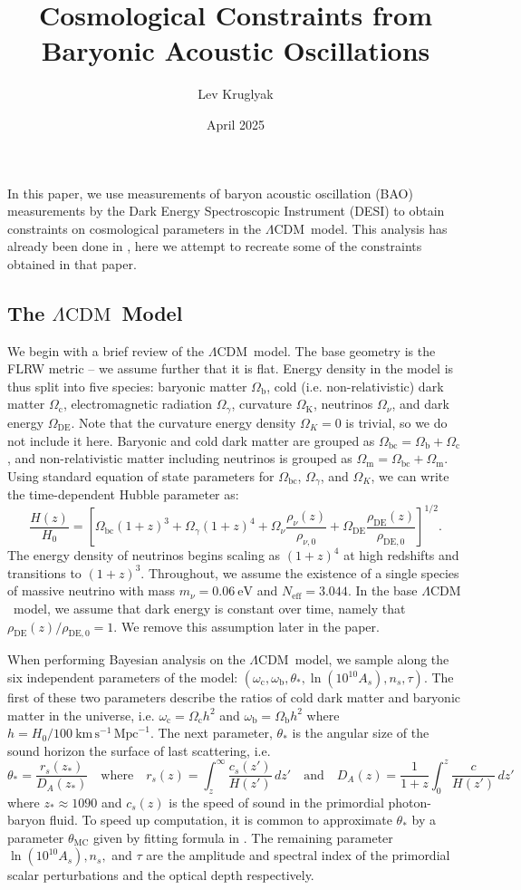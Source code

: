 \documentclass{lkx_paper}
\title{Cosmological Constraints from \\Baryonic Acoustic Oscillations}
\date{April 2025}
\author{Lev Kruglyak}
\renewcommand{\b}{{\mathrm{b}}}
\renewcommand{\c}{{\mathrm{c}}}
\newcommand{\bc}{{\mathrm{bc}}}
\newcommand{\K}{{\mathrm{K}}}
\newcommand{\m}{{\mathrm{m}}}
\newcommand{\DE}{{\mathrm{DE}}}
\newcommand{\MC}{{\mathrm{MC}}}
\newcommand{\LCDM}{$\Lambda\mathrm{CDM}$~}
\newcommand{\Neff}{{N_\mathrm{eff}}}
\providecommand{\eVsi}[1]{\qty{#1}{\mathrm{eV}}}
\providecommand{\Hsi}[1]{\qty{#1}{\km\,\s^{-1}\,\mathrm{Mpc}^{-1}}}
\begin{document}
In this paper, we use measurements of baryon acoustic oscillation (BAO) measurements by the Dark Energy Spectroscopic Instrument (DESI) to obtain constraints on cosmological parameters in the \LCDM model. This analysis has already been done in \cite{desicollaboration2025desidr2resultsii}, here we attempt to recreate some of the constraints obtained in that paper.

\subsection*{The \LCDM Model}
We begin with a brief review of the \LCDM model. The base geometry is the FLRW metric -- we assume further that it is flat.
Energy density in the model is thus split into five species: baryonic matter $\Omega_\b$, cold (i.e. non-relativistic) dark matter $\Omega_\c$, electromagnetic radiation $\Omega_\gamma$, curvature $\Omega_\K$, neutrinos $\Omega_\nu$, and dark energy $\Omega_\DE$. Note that the curvature energy density $\Omega_K=0$ is trivial, so we do not include it here. Baryonic and cold dark matter are grouped as $\Omega_\bc=\Omega_\b+\Omega_\c$, and non-relativistic matter including neutrinos is grouped as $\Omega_\m=\Omega_\bc+\Omega_\m$.
Using standard equation of state parameters for $\Omega_\bc$, $\Omega_\gamma$, and $\Omega_K$, we can write the time-dependent Hubble parameter as:
\begin{equation}
  \frac{H(z)}{H_0} = 
  \left[\Omega_\bc(1+z)^3 + \Omega_\gamma(1+z)^4+\Omega_\nu\frac{\rho_\nu(z)}{\rho_{\nu,0}} + \Omega_\DE \frac{\rho_\DE(z)}{\rho_{\DE,0}}\right]^{1/2}.
\end{equation}
The energy density of neutrinos begins scaling as $(1+z)^4$ at high redshifts and transitions to $(1+z)^3$. Throughout, we assume the existence of a single species of massive neutrino with mass $m_\nu = \eVsi{0.06}$ and $\Neff=3.044$. In the base \LCDM model, we assume that dark energy is constant over time, namely that $\rho_{\DE}(z)/\rho_{\DE,0}=1$. We remove this assumption later in the paper.

When performing Bayesian analysis on the \LCDM model, we sample along the six independent parameters of the model: $(\omega_\c, \omega_\b, \theta_*, \ln(10^{10}A_s), n_s, \tau)$. The first of these two parameters describe the ratios of cold dark matter and baryonic matter in the universe, i.e. $\omega_\c=\Omega_\c h^2$ and $\omega_\b = \Omega_\b h^2$ where $h=H_0/\Hsi{100}$. The next parameter, $\theta_*$ is the angular size of the sound horizon the surface of last scattering, i.e.
\begin{equation}
  \theta_* = \frac{r_s(z_*)}{D_A(z_*)}\quad\textrm{where}\quad
  r_s(z) = \int_z^\infty \frac{c_s(z')}{H(z')}\,dz'\quad\textrm{and}\quad D_A(z)=\frac{1}{1+z}\int_0^z\frac{c}{H(z')}\,dz'
\end{equation}
where $z_*\approx 1090$ and $c_s(z)$ is the speed of sound in the primordial photon-baryon fluid. To speed up computation, it is common to approximate $\theta_*$ by a parameter $\theta_\MC$ given by fitting formula in \cite{Lewis_2000}. The remaining parameter $\ln(10^{10} A_s), n_s,$ and $\tau$ are the amplitude and spectral index of the primordial scalar perturbations and the optical depth respectively. 
\end{document}
